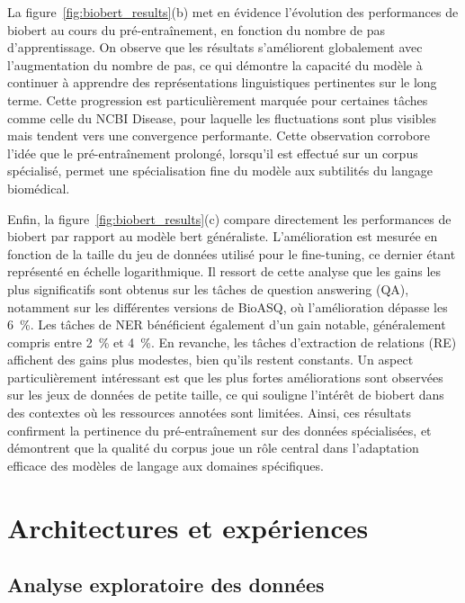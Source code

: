 \documentclass[12pt]{report}
\begin{document}
La figure~\ref{fig:biobert_results}(b) met en évidence l’évolution des performances de \gls{biobert} au cours du pré-entraînement, en fonction du nombre de pas d’apprentissage. On observe que les résultats s’améliorent globalement avec l’augmentation du nombre de pas, ce qui démontre la capacité du modèle à continuer à apprendre des représentations linguistiques pertinentes sur le long terme. Cette progression est particulièrement marquée pour certaines tâches comme celle du NCBI Disease, pour laquelle les fluctuations sont plus visibles mais tendent vers une convergence performante. Cette observation corrobore l'idée que le pré-entraînement prolongé, lorsqu’il est effectué sur un corpus spécialisé, permet une spécialisation fine du modèle aux subtilités du langage biomédical.

Enfin, la figure~\ref{fig:biobert_results}(c) compare directement les performances de \gls{biobert} par rapport au modèle \gls{bert} généraliste. L’amélioration est mesurée en fonction de la taille du jeu de données utilisé pour le fine-tuning, ce dernier étant représenté en échelle logarithmique. Il ressort de cette analyse que les gains les plus significatifs sont obtenus sur les tâches de question answering (QA), notamment sur les différentes versions de BioASQ, où l'amélioration dépasse les 6~\%. Les tâches de NER bénéficient également d’un gain notable, généralement compris entre 2~\% et 4~\%. En revanche, les tâches d’extraction de relations (RE) affichent des gains plus modestes, bien qu’ils restent constants. Un aspect particulièrement intéressant est que les plus fortes améliorations sont observées sur les jeux de données de petite taille, ce qui souligne l’intérêt de \gls{biobert} dans des contextes où les ressources annotées sont limitées. Ainsi, ces résultats confirment la pertinence du pré-entraînement sur des données spécialisées, et démontrent que la qualité du corpus joue un rôle central dans l’adaptation efficace des modèles de langage aux domaines spécifiques.

\newpage

\chapter{Architectures et expériences}

\section{Analyse exploratoire des données}
\end{document}

